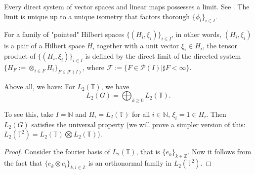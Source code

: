 \begin{remark}
    Every direct system of vector spaces and linear maps possesses a limit. 
    See \cite[\href{https://stacks.math.columbia.edu/tag/07N7}{Section 07N7}]{stacks-project}. The limit is unique up to a unique isometry that factors thorough $\{\phi_i\}_{i\in I}$.
\end{remark}

\begin{definition}
    For a family of "pointed" Hilbert spaces $\{(H_i,\xi_i)\}_{i\in I}$, in other words, $(H_i,\xi_i)$ is a pair of a Hilbert space $H_i$ together with a unit vector $\xi_i\in H_i$, the tensor product of $\{(H_i,\xi_i)\}_{i\in I}$ is defined by the direct limit of the directed system $\{H_F:=\otimes_{i\in F}H_i\}_{F\in\mathcal{F}(I)}$, where $\mathcal{F}:=\{F\in\mathcal{P}(I)|\sharp F<\infty\}$.
\end{definition}

Above all, we have:
    For $L_2(\mathbb{T})$, we have
        \[  L_2(G)=\bigoplus_{k\geq0}L_2(\mathbb{T}).   \]

To see this, take $I=\mathbb{N}$ and $H_i=L_2(\mathbb{T})$ for all $i\in\mathbb{N}$, $\xi_i=1\in H_i$. Then $L_2(G)$ satisfies the universal property (we will prove a simpler version of this: $L_2(\mathbb{T}^2)=L_2(\mathbb{T})\bigotimes L_2(\mathbb{T})$).

\begin{proof}
    Consider the fourier basis of $L_2(\mathbb{T})$, that is $\{e_k\}_{k\in\mathbb{Z}}$. 
    Now it follows from the fact that $\{e_k\otimes e_l\}_{k,l\in\mathbb{Z}}$ is an orthonormal family in $L_2(\mathbb{T}^2)$.
\end{proof}

